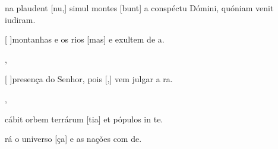 {  {\item {}na plaudent [nu,] simul montes [\-bunt] a conspéctu Dómini, quóniam venit iudi\-ram.~\Antiphona}%
    {\item {}[ ]{mon}tanhas e os rios [mas] e exultem de a.~\Antiphona},
  {}%
    {\item {}[ ]{pre}sença do Senhor, pois [,] vem julgar a ra.~\Antiphona},
  {\item {}cábit orbem terrárum [tia] et pópulos in te.~\Antiphona}%
    {\item {}rá o universo [ça] e as nações com de.~\Antiphona}
}